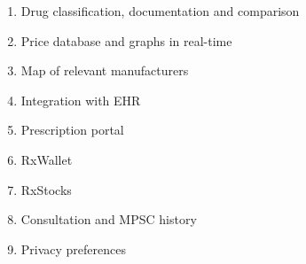 \begin{enumerate}
  \item Drug classification, documentation and comparison
    
  
  \item Price database and graphs in real-time
    
    
  \item Map of relevant manufacturers
    
    
  \item Integration with EHR
  \item Prescription portal
  \item RxWallet
  \item RxStocks
  \item Consultation and MPSC history
  \item Privacy preferences
\end{enumerate}
